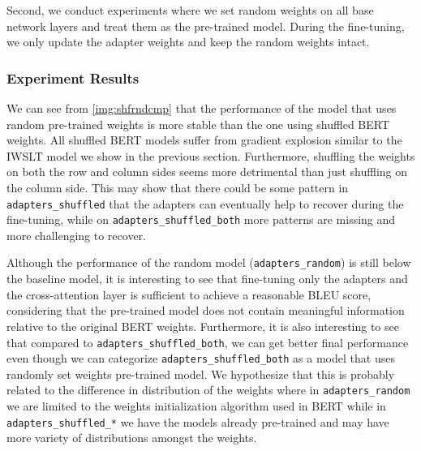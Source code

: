 Second, we conduct experiments where we set random weights on all base network layers and treat them as the pre-trained model. During the fine-tuning, we only update the adapter weights and keep the random weights intact.

\subsubsection{Experiment Results}
We can see from \cref{img:shfrndcmp} that the performance of the model that uses random pre-trained weights is more stable than the one using shuffled BERT weights. All shuffled BERT models suffer from gradient explosion similar to the IWSLT model we show in the previous section. Furthermore, shuffling the weights on both the row and column sides seems more detrimental than just shuffling on the column side. This may show that there could be some pattern in \texttt{adapters\_shuffled} that the adapters can eventually help to recover during the fine-tuning, while on \texttt{adapters\_shuffled\_both} more patterns are missing and more challenging to recover.

Although the performance of the random model (\texttt{adapters\_random}) is still below the baseline model, it is interesting to see that fine-tuning only the adapters and the cross-attention layer is sufficient to achieve a reasonable BLEU score, considering that the pre-trained model does not contain meaningful information relative to the original BERT weights. Furthermore, it is also interesting to see that compared to \texttt{adapters\_shuffled\_both}, we can get better final performance even though we can categorize \texttt{adapters\_shuffled\_both} as a model that uses randomly set weights pre-trained model. We hypothesize that this is probably related to the difference in distribution of the weights where in \texttt{adapters\_random} we are limited to the weights initialization algorithm used in BERT while in \texttt{adapters\_shuffled\_*} we have the models already pre-trained and may have more variety of distributions amongst the weights.

